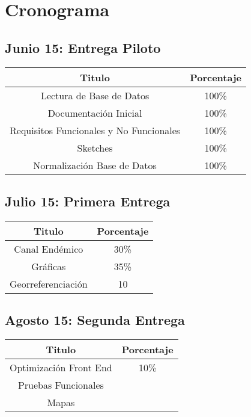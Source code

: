 \section{Cronograma}

\subsection{Junio 15: Entrega Piloto}

\begin{center}
\begin{tabular}{|c|c|}
\hline 
Titulo & Porcentaje \\ \hline
\hline
Lectura de Base de Datos & 100\% \\ \hline
Documentación Inicial & 100\% \\ \hline
Requisitos Funcionales y No Funcionales & 100\%\\ \hline
Sketches & 100\%\\ \hline
Normalización Base de Datos & 100\%\\ \hline

\end{tabular}
\end{center}

\subsection{Julio 15: Primera Entrega}

\begin{center}
\begin{tabular}{|c|c|}
\hline 
Titulo & Porcentaje \\ \hline
\hline
Canal Endémico & 30\% \\ \hline
Gráficas & 35\% \\ \hline
Georreferenciación & 10\\ \hline
\end{tabular}
\end{center}


\subsection{Agosto 15: Segunda Entrega }


\begin{center}
\begin{tabular}{|c|c|}
\hline 
Titulo & Porcentaje \\ \hline
\hline
Optimización Front End &  10\% \\ \hline
Pruebas Funcionales & \\ \hline
Mapas & \\ \hline
\end{tabular}
\end{center}

